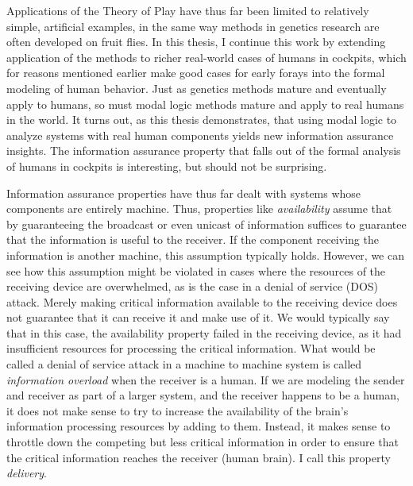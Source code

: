 Applications of the Theory of Play have thus far been limited to relatively simple, artificial examples, in the same way methods in genetics research are often developed on fruit flies. In this thesis, I continue this work by extending application of the methods to richer real-world cases of humans in cockpits, which for reasons mentioned earlier make good cases for early forays into the formal modeling of human behavior. Just as genetics methods mature and eventually apply to humans, so must modal logic methods mature and apply to real humans in the world. It turns out, as this thesis demonstrates, that using modal logic to analyze systems with real human components yields new information assurance insights. The information assurance property that falls out of the formal analysis of humans in cockpits is interesting, but should not be surprising.

Information assurance properties have thus far dealt with systems whose components are entirely machine. Thus, properties like \emph{availability} assume that by guaranteeing the broadcast or even unicast of information suffices to guarantee that the information is useful to the receiver. If the component receiving the information is another machine, this assumption typically holds. However, we can see how this assumption might be violated in cases where the resources of the receiving device are overwhelmed, as is the case in a denial of service (DOS) attack. Merely making critical information available to the receiving device does not guarantee that it can receive it and make use of it. We would typically say that in this case, the availability property failed in the receiving device, as it had insufficient resources for processing the critical information. What would be called a denial of service attack in a machine to machine system is called \emph{information overload} when the receiver is a human. If we are modeling the sender and receiver as part of a larger system, and the receiver happens to be a human, it does not make sense to try to increase the availability of the brain's information processing resources by adding to them.  Instead, it makes sense to throttle down the competing but less critical information in order to ensure that the critical information reaches the receiver (human brain). I call this property \emph{delivery}. 

